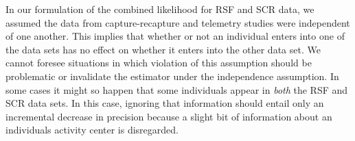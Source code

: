 \documentclass[12pt]{article}
\begin{document}
In our formulation of the combined likelihood for RSF and SCR data, we
assumed the data from capture-recapture and telemetry studies were
independent of one another. This implies that whether or not an
individual enters into one of the data sets has no effect on whether
it enters into the other data set. We cannot foresee situations in
which violation of this assumption should be problematic or invalidate
the estimator under the independence assumption.  In some cases it
might so happen that some individuals appear in {\it both} the RSF and
SCR data sets. In this case, ignoring that information should entail
only an incremental decrease in precision because a slight bit of
information about an individuals activity center is disregarded.
\end{document}
